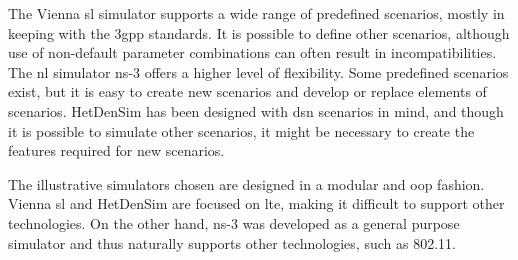 \documentclass[conference]{IEEEtran}
\begin{document}
The Vienna \ac{sl} simulator supports a wide range of predefined scenarios, mostly in keeping with the \ac{3gpp} standards. It is possible to define other scenarios, although use of non-default parameter combinations can often result in incompatibilities. The \ac{nl} simulator ns-3 offers a higher level of flexibility. Some predefined scenarios exist, but it is easy to create new scenarios and develop or replace elements of scenarios. HetDenSim has been designed with \ac{dsn} scenarios in mind, and though it is possible to simulate other scenarios, it might be necessary to create the features required for new scenarios.

The illustrative simulators chosen are designed in a modular and \ac{oop} fashion. Vienna \ac{sl} and HetDenSim are focused on \ac{lte}, making it difficult to support other technologies. On the other hand, ns-3 was developed as a general purpose simulator and thus naturally supports other technologies, such as 802.11.
\end{document}
